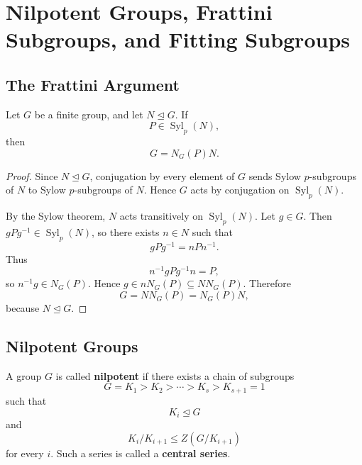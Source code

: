 \chapter{Nilpotent Groups, Frattini Subgroups, and Fitting Subgroups}

\providecommand{\Syl}{\operatorname{Syl}}
\providecommand{\Max}{\operatorname{Max}}
\providecommand{\Fit}{\operatorname{Fit}}
\providecommand{\radn}{\operatorname{rad}}
\providecommand{\Core}{\operatorname{Core}}
\providecommand{\Soc}{\operatorname{Soc}}
\providecommand{\normal}{\trianglelefteq}
\providecommand{\nnormal}{\triangleleft}

\section{The Frattini Argument}

\begin{theorem}
Let \(G\) be a finite group, and let \(N\normal G\). If
\[
    P\in \Syl_p(N),
\]
then
\[
    G=N_G(P)N.
\]
\end{theorem}

\begin{proof}
Since \(N\normal G\), conjugation by every element of \(G\) sends Sylow
\(p\)-subgroups of \(N\) to Sylow \(p\)-subgroups of \(N\). Hence \(G\) acts by
conjugation on \(\Syl_p(N)\).

By the Sylow theorem, \(N\) acts transitively on \(\Syl_p(N)\). Let \(g\in G\).
Then \(gPg^{-1}\in \Syl_p(N)\), so there exists \(n\in N\) such that
\[
    gPg^{-1}=nPn^{-1}.
\]
Thus
\[
    n^{-1}gP g^{-1}n=P,
\]
so \(n^{-1}g\in N_G(P)\). Hence \(g\in nN_G(P)\subseteq NN_G(P)\). Therefore
\[
    G=NN_G(P)=N_G(P)N,
\]
because \(N\normal G\).
\end{proof}

\section{Nilpotent Groups}

\begin{definition}
A group \(G\) is called \textbf{nilpotent} if there exists a chain of subgroups
\[
    G=K_1>K_2>\cdots>K_s>K_{s+1}=1
\]
such that
\[
    K_i\normal G
\]
and
\[
    K_i/K_{i+1}\leq Z(G/K_{i+1})
\]
for every \(i\). Such a series is called a \textbf{central series}.
\end{definition}

